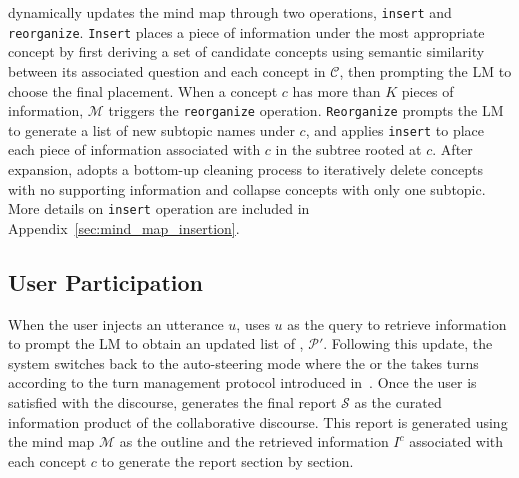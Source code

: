 \documentclass[11pt]{article}
\begin{document}
\system dynamically updates the mind map through two operations, \texttt{insert} and \texttt{reorganize}. \texttt{Insert} places a piece of information under the most appropriate concept by first deriving a set of candidate concepts using semantic similarity between its associated question and each concept in $\mathcal{C}$, then prompting the LM to choose the final placement. When a concept $c$ has more than $K$ pieces of information, $\mathcal{M}$ triggers the \texttt{reorganize} operation. \texttt{Reorganize} prompts the LM to generate a list of new subtopic names under $c$, and applies \texttt{insert} to place each piece of information associated with $c$ in the subtree rooted at $c$. After expansion, \system adopts a bottom-up cleaning process to iteratively delete concepts with no supporting information and collapse concepts with only one subtopic. More details on \texttt{insert} operation are included in Appendix~\ref{sec:mind_map_insertion}.



\subsection{User Participation}
\label{sec:human_steering_mode}
When the user injects an utterance $u$, \system uses $u$ as the query to retrieve information to prompt the LM to obtain an updated list of \experts, $\mathcal{P}'$. 
Following this update, the system switches back to the auto-steering mode where the \expert or the \moderator takes turns according to the turn management protocol introduced in~. Once the user is satisfied with the discourse, \system generates the final report $\mathcal{S}$ as the curated information product of the collaborative discourse. This report is generated using the mind map $\mathcal{M}$ as the outline and the retrieved information $I^{c}$ associated with each concept $c$ to generate the report section by section.


\end{document}
